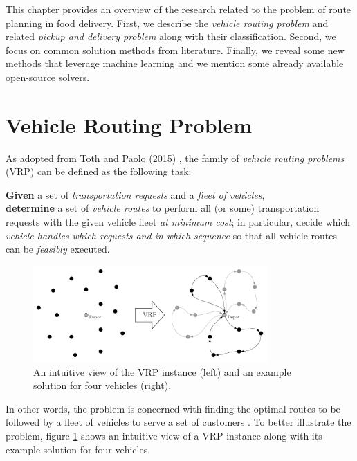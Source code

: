 This chapter provides an overview of the research related to the problem of route planning in food delivery. First, we describe the \emph{vehicle routing problem} and related \emph{pickup and delivery problem} along with their classification. Second, we focus on common solution methods from literature. Finally, we reveal some new methods that leverage machine learning and we mention some already available open-source solvers.

\section{Vehicle Routing Problem}

As adopted from Toth and Paolo (2015) \cite{toth2015vrp}, the family of \emph{vehicle routing problems} (VRP) can be defined as the following task:

\hfill\begin{minipage}{\dimexpr\textwidth-2cm}
    \vspace{.5cm}
    \textbf{Given} a set of \emph{transportation requests} and a \emph{fleet of vehicles},\\
    \textbf{determine} a set of \emph{vehicle routes} to perform all (or some) transportation requests with the given vehicle fleet \emph{at minimum cost}; in particular, decide which \emph{vehicle handles which requests and in which sequence} so that all vehicle routes can be \emph{feasibly} executed.
    \vspace{.1cm}
\end{minipage}

	\begin{figure}[!ht]
		\centering
		\includegraphics[width=0.8\textwidth]{figures/illustration.pdf}
		\caption[An intuitive view of the VRP instance and an example solution.]{An intuitive view of the VRP instance (left) and an example solution for four vehicles (right).}
		\label{fig:illustration}
	\end{figure}

In other words, the problem is concerned with finding the optimal routes to be followed by a fleet of vehicles to serve a set of customers \cite{golden2008the}. To better illustrate the problem, figure \ref{fig:illustration} shows an intuitive view of a VRP instance along with its example solution for four vehicles.

